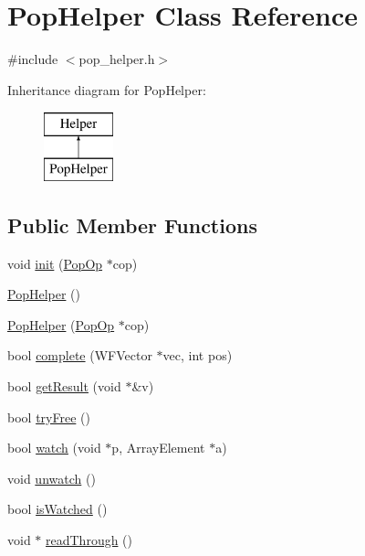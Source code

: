 \hypertarget{class_pop_helper}{}\section{Pop\+Helper Class Reference}
\label{class_pop_helper}


{\ttfamily \#include $<$pop\+\_\+helper.\+h$>$}

Inheritance diagram for Pop\+Helper\+:\begin{figure}[H]
\begin{center}
\leavevmode
\includegraphics[height=2.000000cm]{class_pop_helper}
\end{center}
\end{figure}
\subsection*{Public Member Functions}
\begin{DoxyCompactItemize}
\item 
void \hyperlink{class_pop_helper_afc46783535b23c91f252e182d771ae3f}{init} (\hyperlink{class_pop_op}{Pop\+Op} $\ast$cop)
\item 
\hyperlink{class_pop_helper_a3d5d4f3c3cf005787a9cefabbfe895ed}{Pop\+Helper} ()
\item 
\hyperlink{class_pop_helper_a4258b16f767e4dff8e9799032903d4ce}{Pop\+Helper} (\hyperlink{class_pop_op}{Pop\+Op} $\ast$cop)
\item 
bool \hyperlink{class_pop_helper_a74d0a4ce1e4f8d2705fc69a014bfc924}{complete} (W\+F\+Vector $\ast$vec, int pos)
\item 
bool \hyperlink{class_pop_helper_a9902a2778674e0577b9c84f3c7a52a0d}{get\+Result} (void $\ast$\&v)
\item 
bool \hyperlink{class_pop_helper_a53b61d8fd4386a4cec5fca6ef399d284}{try\+Free} ()
\item 
bool \hyperlink{class_pop_helper_a9fd70c008d5bded56884fd78030f4d56}{watch} (void $\ast$p, Array\+Element $\ast$a)
\item 
void \hyperlink{class_pop_helper_a15c8fd43c7291a6750f7e66c737f2593}{unwatch} ()
\item 
bool \hyperlink{class_pop_helper_a2c831cbed796924dfdad5e5bd1bdd4c3}{is\+Watched} ()
\item 
void $\ast$ \hyperlink{class_pop_helper_a83b4ba96b55bf0f32e288e73b0af2d32}{read\+Through} ()
\end{DoxyCompactItemize}
